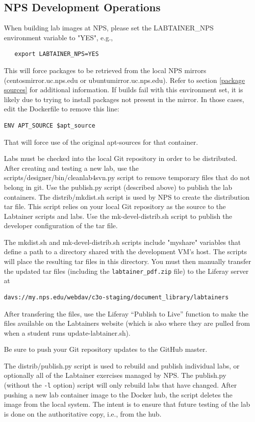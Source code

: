 \documentclass[12pt]{article}
\begin{document}
\subsection{NPS Development Operations}
When building lab images at NPS, please set the LABTAINER\_NPS environment variable to "YES", e.g.,
\begin{verbatim}
   export LABTAINER_NPS=YES
\end{verbatim}
This will force packages to be retrieved from the local NPS mirrors (centosmirror.uc.nps.edu or
ubuntumirror.uc.nps.edu).  Refer to section \ref{package sources} for additional information.
If builds fail with this environment set, it is likely due to trying to install packages not present
in the mirror.  In those cases, edit the Dockerfile to remove this line:
\begin{verbatim}
ENV APT_SOURCE $apt_source
\end{verbatim}
\noindent That will force use of the original apt-sources for that container.

Labs must be checked into the local Git repository in order to be distributed.  After creating and testing
a new lab, use the scripts/designer/bin/cleanlab4svn.py script to remove temporary files that do not belong in 
git.  Use the publish.py script (described above) to publish the lab containers.
The distrib/mkdist.sh script is used by NPS to create the distribution tar file.  This script relies on
your local Git repository as the source to the Labtainer scripts and labs.  Use the mk-devel-distrib.sh script
to publish the developer configuration of the tar file.  

The mkdist.sh and mk-devel-distrib.sh scripts include "myshare" variables that define a path to a directory
shared with the development VM's host. The scripts will place the resulting tar files in this directory.  You
must then manually transfer the updated tar files (including the {\tt labtainer\_pdf.zip} file) to the Liferay
server at
\begin{verbatim}
davs://my.nps.edu/webdav/c3o-staging/document_library/labtainers
\end{verbatim}
After transfering the files, use the Liferay ``Publish to Live'' function to make the files available on the
Labtainers website (which is also where they are pulled from when a student runs update-labtainer.sh).

Be sure to push your Git repository updates to the GitHub master.

The distrib/publish.py script is used to rebuild and 
publish individual labs, or optionally all of the Labtainer exercises managed by NPS.
The publish.py (without the {\tt -l} option) script will only rebuild labs that have changed.  After pushing a new lab container
image to the Docker hub, the script deletes the image from the local system.  The intent is to
ensure that future testing of the lab is done on the authoritative copy, i.e., from the hub.
\end{document}
